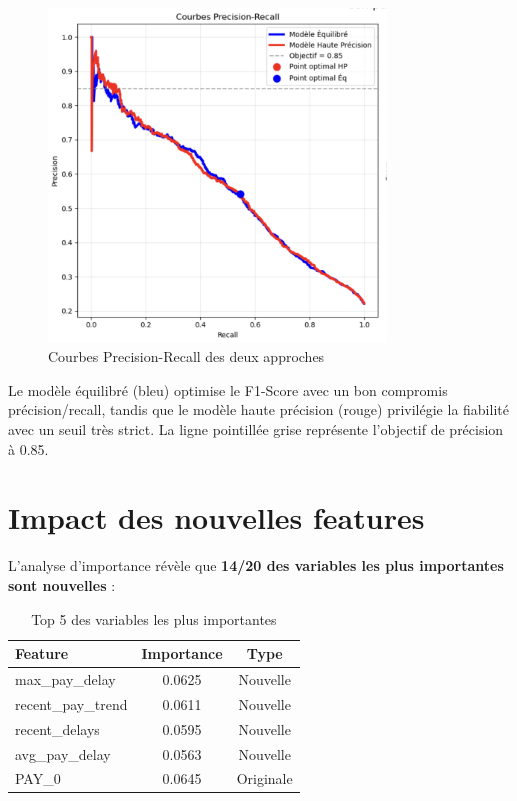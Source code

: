 \documentclass[11pt,a4paper]{article}
\begin{document}
\begin{figure}[H]
\centering
\includegraphics[width=0.8\textwidth]{comparaison_predictions.png}
\caption{Courbes Precision-Recall des deux approches}
\label{fig:predictions}
\end{figure}

Le modèle équilibré (bleu) optimise le F1-Score avec un bon compromis précision/recall, tandis que le modèle haute précision (rouge) privilégie la fiabilité avec un seuil très strict. La ligne pointillée grise représente l'objectif de précision à 0.85.

\section{Impact des nouvelles features}

L'analyse d'importance révèle que \textbf{14/20 des variables les plus importantes sont nouvelles} :

\begin{table}[H]
\centering
\begin{tabular}{@{}lcc@{}}
\toprule
\textbf{Feature} & \textbf{Importance} & \textbf{Type} \\
\midrule
max\_pay\_delay & 0.0625 & Nouvelle \\
recent\_pay\_trend & 0.0611 & Nouvelle \\
recent\_delays & 0.0595 & Nouvelle \\
avg\_pay\_delay & 0.0563 & Nouvelle \\
PAY\_0 & 0.0645 & Originale \\
\bottomrule
\end{tabular}
\caption{Top 5 des variables les plus importantes}
\end{table}
\end{document}
